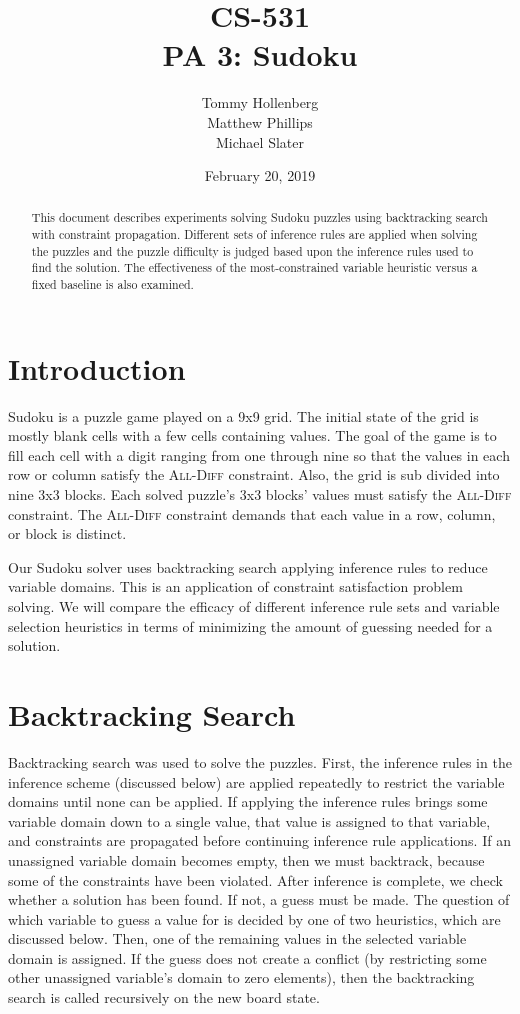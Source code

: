 \documentclass{article}
\title{CS-531 \\
        PA 3: Sudoku}
\author{Tommy Hollenberg \\
        Matthew Phillips \\
        Michael Slater}
\date{February 20, 2019}
\begin{document}
\maketitle

\begin{abstract}
        \noindent This document describes experiments solving Sudoku puzzles using backtracking search with constraint propagation. Different sets of inference rules are applied when solving the puzzles and the puzzle difficulty is judged based upon the inference rules used to find the solution. The effectiveness of the most-constrained variable heuristic versus a fixed baseline is also examined. 
\end{abstract}
\clearpage

\tableofcontents
\clearpage
\section{Introduction}
Sudoku is a puzzle game played on a 9x9 grid. The initial state of the grid is mostly blank cells with a few cells containing values. The goal of the game is to fill each cell with a digit ranging from one through nine so that the values in each row or column satisfy the \textsc{All-Diff} constraint. Also, the grid is sub divided into nine 3x3 blocks. Each solved puzzle's 3x3 blocks' values must satisfy the \textsc{All-Diff} constraint. The \textsc{All-Diff} constraint demands that each value in a row, column, or block is distinct.

Our Sudoku solver uses backtracking search applying inference rules to reduce variable domains. This is an application of constraint satisfaction problem solving. We will compare the efficacy of different inference rule sets and variable selection heuristics in terms of minimizing the amount of guessing needed for a solution.
\section{Backtracking Search}

Backtracking search was used to solve the puzzles. First, the inference rules in the inference scheme (discussed below) are applied repeatedly to restrict the variable domains until none can be applied. If applying the inference rules brings some variable domain down to a single value, that value is assigned to that variable, and constraints are propagated before continuing inference rule applications. If an unassigned variable domain becomes empty, then we must backtrack, because some of the constraints have been violated. After inference is complete, we check whether a solution has been found. If not, a guess must be made. The question of which variable to guess a value for is decided by one of two heuristics, which are discussed below. Then, one of the remaining values in the selected variable domain is assigned. If the guess does not create a conflict (by restricting some other unassigned variable's domain to zero elements), then the backtracking search is called recursively on the new board state.
\end{document}

